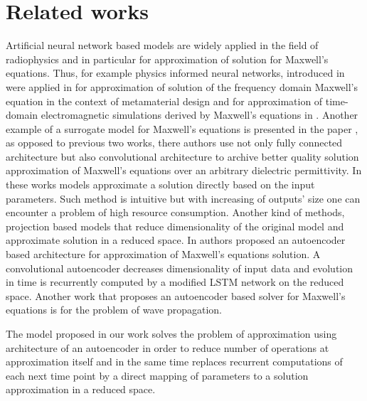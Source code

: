 \documentclass{article} %
\begin{document}
\section{Related works}
Artificial neural network based models are widely applied in the field of radiophysics and in particular for approximation of solution for Maxwell's equations. Thus, for example physics informed neural networks, introduced in \citep{pinn} were applied in \citep{pinn_me_mmd} for approximation of solution of the frequency domain Maxwell's equation in the context of metamaterial design and for approximation of time-domain electromagnetic simulations derived by Maxwell's equations in \citep{pinn_me_tdes}. Another example of a surrogate model for Maxwell's equations is presented in the paper \citep{gm_em}, as opposed to previous two works, there authors use not only fully connected architecture but also convolutional architecture to archive better quality solution approximation of Maxwell’s equations over an arbitrary dielectric permittivity. In these works models approximate a solution directly based on the input parameters. Such method is intuitive but with increasing of outputs' size one can encounter a problem of high resource consumption. Another kind of methods, projection based models that reduce dimensionality of the original model and approximate solution in a reduced space. In \citep{pbm_me_tema} authors proposed an autoencoder based architecture for approximation of Maxwell's equations solution. A convolutional autoencoder decreases dimensionality of input data and evolution in time is recurrently computed by a modified LSTM\citep{lstm} network on the reduced space. Another work that proposes an autoencoder based solver for Maxwell's equations is \citep{ann_wp} for the problem of wave propagation. 

The model proposed in our work solves the problem of approximation using architecture of an autoencoder in order to reduce number of operations at approximation itself and in the same time replaces recurrent computations of each next time point by a direct mapping of parameters to a solution approximation in a reduced space. 
\end{document}
